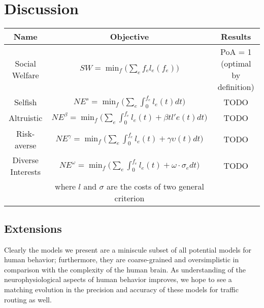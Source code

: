 \section{Discussion}\label{sec:discussion}

\begin{table}
\begin{center}
 \begin{tabular}{|c | c | c|} 
 \hline
 Name & Objective & Results \\
 \hline\hline
     Social Welfare & $SW = \min_f\Big(\sum_e f_el_e(f_e)\Big)$ & PoA = 1 (optimal by definition) \\
 \hline
     Selfish & $NE^s = \min_f\Big(\sum_e\int_0^{f_e} l_e(t)dt\Big)$ & TODO\\
 \hline
     Altruistic & $NE^\beta = \min_f\Big(\sum_e\int_0^{f_e} l_e(t) + \beta tl'e(t)dt\Big)$ & TODO\\
\hline
     Risk-averse & $NE^\gamma = \min_f\Big(\sum_e\int_0^{f_e} l_e(t) + \gamma\upsilon(t)dt\Big)$ & TODO\\
\hline
     Diverse Interests & $NE^\omega = \min_f\Big(\sum_e\int_0^{f_e} l_e(t) + \omega\cdot \sigma_e dt\Big)$ & TODO\\
     & where $l$ and $\sigma$ are the costs of two general criterion &\\
\hline
\end{tabular}
\end{center}
\end{table}

\subsection{Extensions}
Clearly the models we present are a miniscule subset of all potential models for human behavior; 
furthermore, they are coarse-grained and oversimplistic in comparison with the complexity of the human
brain. As understanding of the neurophysiological aspects of human behavior improves, we hope to see a matching evolution in the precision and accuracy of these models for traffic routing as well.
